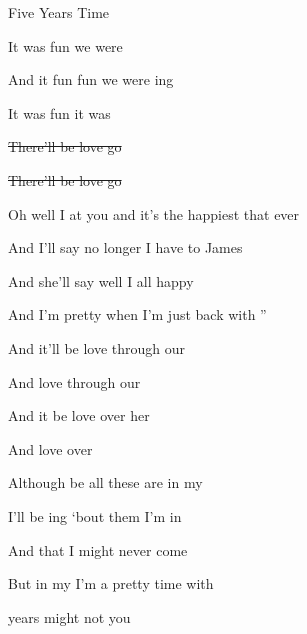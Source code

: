 \begin{SBSong}{Five Years Time}
\begin{SBChorus}
    It was  fun   we were 
    
    And it  fun fun   we were ing
    
    It was  fun   it was 
  \end{SBChorus}
  \begin{SBVerse*}
    
    \sout{There'll be  love    go}
    
    \sout{There'll be  love    go}
  \end{SBVerse*}
  \CBPageBrk
  \begin{SBVerse}
    Oh well I  at you and  it's the happiest that  ever 
    
    And I'll say  no longer  I have to  James 
    
    And she'll say  well I  all  happy 
    
    And I'm  pretty  when I'm just  back with ''
  \end{SBVerse}
  \begin{SBChorus}
    And it'll be  love   through our 
    
    And  love   through our 
    
    And it be  love   over her 
    
    And  love   over 
  \end{SBChorus}
  \begin{SBVerse}
    Although be all these  are  in my 
    
    I'll be ing `bout them  I'm  in 
    
    And  that I  might never  come 
    
    But in my  I'm  a pretty  time with 
  \end{SBVerse}
  \begin{SBChorus}
     years   might not  you
    

\end{SBChorus}
\end{SBSong}
